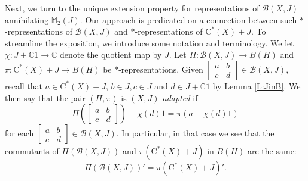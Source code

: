 \documentclass[10pt]{amsart}
\newcommand{\bC}{{\mathbb{C}}}
\newcommand{\bM}{{\mathbb{M}}}
\newcommand{\B}{{\mathcal{B}}}
\newcommand{\rC}{\mathrm{C}}
\theoremstyle{definition}
\begin{document}
Next, we turn to the unique extension property for representations of $\B(X,J)$ annihilating $\bM_2(J)$.  Our approach is predicated on a connection between such $*$-representations of $\B(X,J)$ and $*$-representations of $\rC^*(X)+J$.  To streamline the exposition, we introduce some notation and terminology. We let $\chi:J+\bC 1\to \bC$ denote the quotient map by $J$. Let $\Pi:\B(X,J)\to B(H)$ and $\pi:\rC^*(X)+J\to B(H)$ be  $*$-representations. 
Given $\begin{bmatrix}
a& b \\ c & d
\end{bmatrix}\in \B(X,J)$, recall that $a\in \rC^*(X)+J$, $b\in J,c\in J$ and $d\in J+\bC 1$ by Lemma \ref{L:JinB}.
We then say that the pair $(\Pi,\pi)$ is \emph{$(X,J)$-adapted} if 
\begin{equation}\label{Eq:adapted}
\Pi\left(\begin{bmatrix}
a& b \\ c & d
\end{bmatrix}\right)-\chi(d)1=\pi(a-\chi(d)1)
\end{equation}
for each $\begin{bmatrix}
a& b \\ c & d
\end{bmatrix}\in \B(X,J)$. In particular, in that case we see that the commutants of $\Pi(\B(X,J))$ and $\pi(\rC^*(X)+J)$ in $B(H)$ are the same:
\begin{equation}\label{Eq:commutant}
\Pi(\B(X,J))'=\pi(\rC^*(X)+J)'.
\end{equation}
\end{document}
